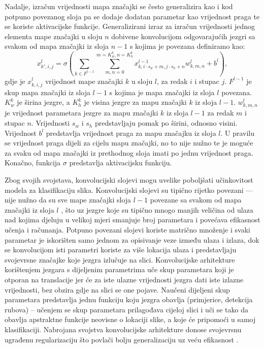 \documentclass[times, utf8, diplomski, numeric]{fer}
\begin{document}
Nadalje, izračun vrijednosti mapa značajki se često generalizira kao i kod potpuno povezanog sloja pa se dodaje dodatan parametar kao vrijednost praga te se koriste aktivacijske funkcije.
Generalizirani izraz za izračun vrijednosti jednog elementa mape značajki u sloju $n$ dobivene konvolucijom odgovarajućih jezgri sa svakom od mapa značajki iz sloja $n-1$ s kojima je povezana definiramo kao:
\begin{equation}
 x^l_{k',i,j}=\sigma\left(\sum_{k\in F^{l-1}}\sum_{m,n=0}^{m=K_w^k,n=K_h^k}x^{l-1}_{k, i \cdot s_w +m, j \cdot s_h +n} w^l_{k, m, n} + b^l\right), \label{eq:generalized_convolution}
\end{equation}
gdje je $x_{k,i,j}^l$ vrijednost mape značajki $k$ u sloju $l$, za redak $i$ i stupac $j$. 
$F^{l-1}$ je skup mapa značajki iz sloja $l-1$ s kojima je mapa značajki iz sloja $l$ povezana. 
$K_w^k$ je širina jezgre, a $K_h^k$ je visina jezgre za mapu značajki $k$ iz sloja $l-1$. 
$w^l_{k, m, n}$ je vrijednost parametara jezgre za mapu značajki $k$ iz sloja $l-1$ za redak $m$ i stupac $n$.
Vrijednosti $s_w$ i $s_h$ predstavljaju pomak po širini, odnosno visini.
Vrijednost $b^l$ predstavlja vrijednost praga za mapu značajku iz sloja $l$. 
U pravilu se vrijednost praga dijeli za cijelu mapu značajki, no to nije nužno te je moguće za svaku od mapa značajki iz prethodnog sloja imati po jednu vrijednost praga.
Konačno, funkcija $\sigma$ predstavlja aktivacijsku funkciju.

Zbog svojih svojstava, konvolucijski slojevi mogu uvelike poboljšati učinkovitost modela za klasifikaciju slika.
Konvolucijski slojevi su tipično rijetko povezani --- nije nužno da su sve mape značajki sloja $l-1$ povezane sa svakom od mapa značajki iz sloja $l$ \citep{book:deeplearningbook}, što uz jezgre koje su tipično mnogo manjih veličina od ulaza nad kojima djeluju u velikoj mjeri smanjuje broj parametara i povećava efikasnost učenja i računanja.
Potpuno povezani slojevi koriste matrično množenje i svaki parametar je iskorišten samo jednom za opisivanje veze između ulaza i izlaza, dok se konvolucijom isti parametri koriste za više lokacija ulaza i predstavljaju svojevrsne značajke koje jezgra izlučuje na slici.
Konvolucijske arhitekture korištenjem jezgara s dijeljenim parametrima uče skup parametara koji je otporan na translacije jer će za iste ulazne vrijednosti jezgra dati iste izlazne vrijednosti, bez obzira gdje na slici se one pojave. 
Naučeni dijeljeni skup parametara predstavlja jednu funkciju koju jezgra obavlja (primjerice, detekcija rubova) -- učenjem se skup parametara prilagođava cijeloj slici i uči se tako da obavlja apstraktne funkcije neovisne o lokaciji slike, a koje će pripomoći u samoj klasifikaciji.
Nabrojana svojstva konvolucijske arhitekture donose svojevrsnu ugrađenu regularizaciju što povlači bolju generalizaciju uz veću efikasnost \citep{book:deeplearningbook} \citep{masters:vukotic_ms} \citep{seminar:rela}.
\end{document}
